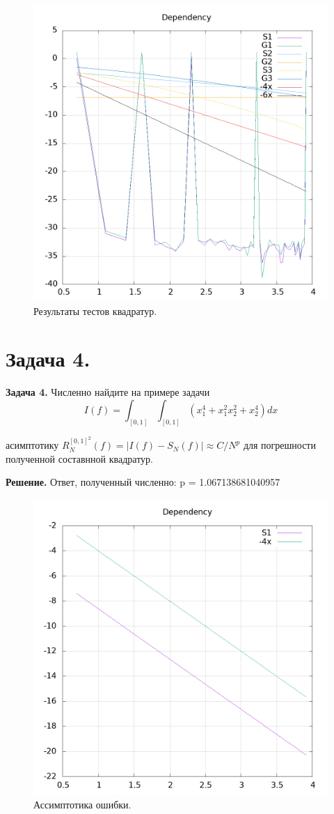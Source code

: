 \documentclass[14pt,a4paper]{extarticle}
\newcommand{\1}{\mathbbm{1}}
\begin{document}
    \begin{figure}
        \centering
        \includegraphics[scale=0.7]{dep.png}
        \caption{Результаты тестов квадратур.}
    \end{figure}



    \section{\textbf{Задача 4.}}
\textbf{Задача 4.}  Численно найдите на примере задачи
\begin{equation*}
    I(f) = \int_{[0,1]}\int_{[0,1]} (x_1^4 + x_1^2 x_2^2 + x_2^4)dx
\end{equation*}

асимптотику $R^{[0,1]^2}_N(f) = |I(f) - S_N(f)| \approx C/N^p$ для погрешности полученной составнной
квадратур.

\textbf{Решение.} Ответ, полученный численно: p =     1.067138681040957
\begin{figure}
    \centering
    \includegraphics[scale=0.7]{dep4.png}
    \caption{Ассимптотика ошибки.}
\end{figure}
\end{document}
